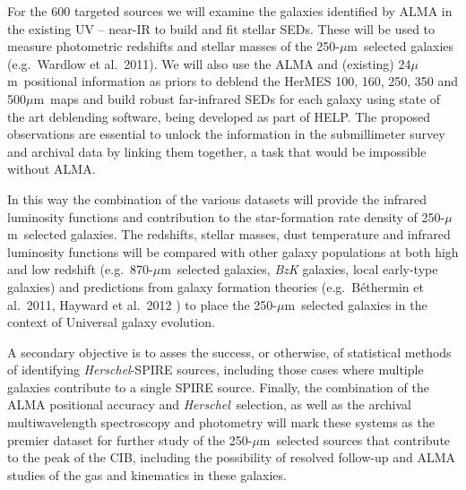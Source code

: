 \documentclass[12pt,a4paper]{article}
\newcommand{\herschel}{{\it Herschel}}
\newcommand{\micron}{$\mu$m}
\begin{document}
For the 600 targeted sources we will examine the galaxies
identified by ALMA in the existing UV -- near-IR to build and fit
stellar SEDs. These will be used to measure photometric redshifts and
stellar masses of the 250-\micron\ selected galaxies (e.g.\ Wardlow et
al.\ 2011). We will also use the ALMA and (existing) 24\micron\
positional information as priors to deblend the HerMES 100, 160, 250,
350 and 500\micron\ maps and build robust far-infrared SEDs for each
galaxy using state of the art deblending software, being developed as part of HELP. The
proposed observations are essential to unlock the information in the
submillimeter survey and archival data by linking them together, a
task that would be impossible without ALMA.

In this way the combination of the various datasets will provide the infrared
luminosity functions and contribution to the star-formation rate
density of 250-\micron\ selected galaxies. The redshifts, stellar
masses, dust temperature and infrared luminosity functions will be
compared with other galaxy populations at both high and low redshift
(e.g.\ 870-\micron\ selected galaxies, {\it BzK} galaxies, local
early-type galaxies) and predictions from galaxy formation theories
(e.g.\ B\'ethermin et al.\ 2011, Hayward et al.\ 2012 ) to place the
250-\micron\ selected galaxies in the context of Universal galaxy
evolution.

A secondary objective is to asses the
success, or otherwise, of statistical methods of identifying
\herschel-SPIRE sources, including those cases where multiple galaxies
contribute to a single SPIRE source. Finally, the combination of the
ALMA positional accuracy and \herschel\ selection, as well as the
archival multiwavelength spectroscopy and photometry will mark these
systems as the premier dataset for further study of the 250-\micron\ selected
sources that contribute to the peak of the CIB, including the
possibility of resolved follow-up and ALMA studies of the gas and kinematics in
these galaxies. 


\end{document}
